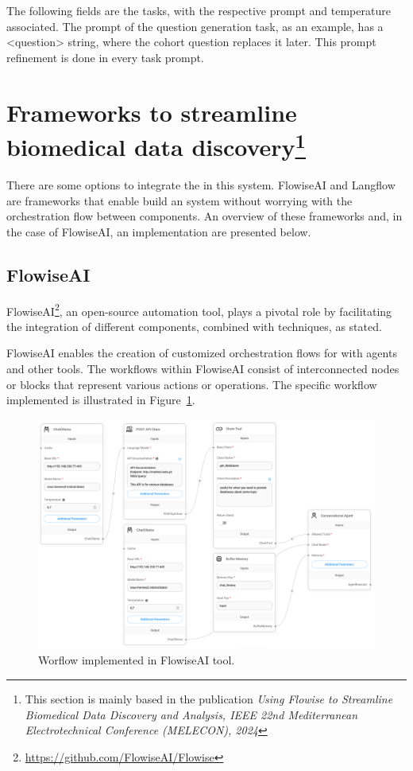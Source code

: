 The following fields are the tasks, with the respective prompt and temperature associated. The prompt of the question generation task, as an example, has a <question> string, where the cohort question replaces it later. This prompt refinement is done in every task prompt.



\section{Frameworks to streamline biomedical data discovery\protect\footnote{This section is mainly based in the publication \textit{Using Flowise to Streamline Biomedical Data Discovery and Analysis, IEEE 22nd Mediterranean Electrotechnical Conference (MELECON), 2024}}}

There are some options to integrate the {\llm} in this system. FlowiseAI and Langflow are frameworks that enable build an {\llm} system without worrying with the orchestration flow between components. An overview of these frameworks and, in the case of FlowiseAI, an implementation are presented below.



\subsection{FlowiseAI}
\label{flowise}

FlowiseAI\footnote{\url{https://github.com/FlowiseAI/Flowise}}, an open-source automation tool, plays a pivotal role by facilitating the integration of different {\ai} components, combined with {\ir} techniques, as \citet{reis2024flowise} stated.

FlowiseAI enables the creation of customized orchestration flows for {\llm} with {\ai} agents and other tools. The workflows within FlowiseAI consist of interconnected nodes or blocks that represent various actions or operations. The specific workflow implemented is illustrated in Figure~\ref{fig_workflow}.


\begin{figure}[H]
    \includegraphics[width=\textwidth]{figs/chapter3/workflow.png}
    \centering
    \caption{Worflow implemented in FlowiseAI tool.}
    \label{fig_workflow}
\end{figure}


